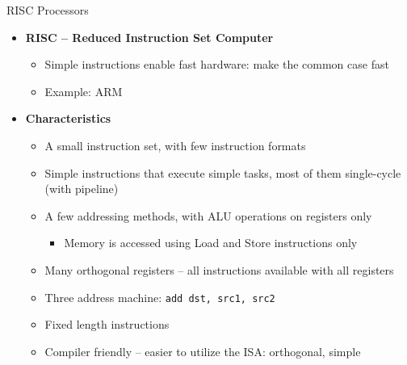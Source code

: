 \documentclass[aspectratio=169,12pt]{beamer}
\begin{document}
\begin{frame}{RISC Processors}
\begin{itemize}
    \item \textbf{RISC -- Reduced Instruction Set Computer}
    \begin{itemize}
        \item Simple instructions enable fast hardware: make the common case fast
        \item Example: ARM
    \end{itemize}
    \item \textbf{Characteristics}
    \begin{itemize}
        \item A small instruction set, with few instruction formats
        \item Simple instructions that execute simple tasks, most of them single-cycle (with pipeline)
        \item A few addressing methods, with ALU operations on registers only
        \begin{itemize}
            \item Memory is accessed using Load and Store instructions only
        \end{itemize}
        \item Many orthogonal registers -- all instructions available with all registers
        \item Three address machine: \quad \texttt{add dst, src1, src2}
        \item Fixed length instructions
        \item Compiler friendly -- easier to utilize the ISA: orthogonal, simple
    \end{itemize}
\end{itemize}
\end{frame}
\end{document}
